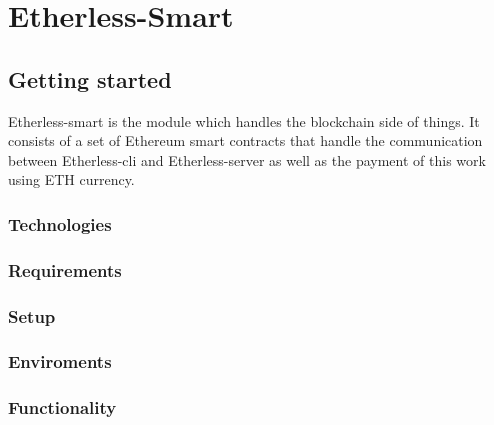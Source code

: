 \section{Etherless-Smart}
	
	\subsection{Getting started}
	Etherless-smart is the module which handles the blockchain side of things. It consists of a set of Ethereum smart contracts that handle the communication between Etherless-cli and Etherless-server as well as the payment of this work using ETH currency.
	
		\subsubsection{Technologies} %
		
		\subsubsection{Requirements} %
		
		\subsubsection{Setup} %
		
		\subsubsection{Enviroments} %
		
		\subsubsection{Functionality} %
	
